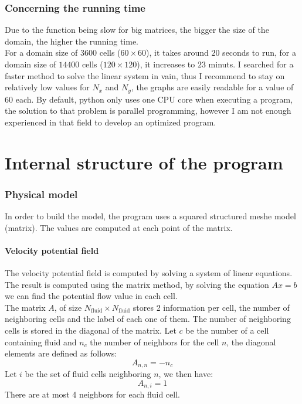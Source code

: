 \section{Concerning the running time}
Due to the function  being slow for
big matrices, the bigger the size of the domain, the higher the running time.\\
For a domain size of $\num{3600}$ cells ($\num{60} \times \num{60}$), it takes
around $\num{20}$ seconds to run, for a domain size of $\num{14400}$ cells
($\num{120} \times \num{120}$), it increases to $\num{23}$ minuts. 
\smallbreak{}
I searched for a faster method to solve the linear system in vain, thus I
recommend to stay on relatively low values for $N_x$ and $N_y$, the graphs are
easily readable for a value of $\num{60}$ each.
\smallbreak{}
By default, python only uses one CPU core when executing a program, the
solution to that problem is parallel programming, however I am not enough
experienced in that field to develop an optimized program.

\newpage
\part{Internal structure of the program}
\section{Physical model}
In order to build the model, the program uses a squared structured meshe
model (matrix). The values are computed at each point of the matrix.

\subsection{Velocity potential field}
The velocity potential field is computed by solving a system of linear
equations. The result is computed using the matrix method, by solving the
equation $Ax = b$ we can find the potential flow value in each cell.\\
The matrix $A$, of size $N_\text{fluid} \times N_\text{fluid}$ stores 2
information per cell, the number of neighboring cells and the label of each
one of them. The number of neighboring cells is stored in the diagonal of the
 matrix. Let $c$ be the number of a cell containing fluid and $n_c$ the number
 of neighbors for the cell $n$, the diagonal elements are defined as follows:
\[
      A_{n, n} = -n_c
\]
Let $i$ be the set of fluid cells neighboring $n$, we then have:
\[
      A_{n, i} = 1
\]
There are at most 4 neighbors for each fluid cell.\\

